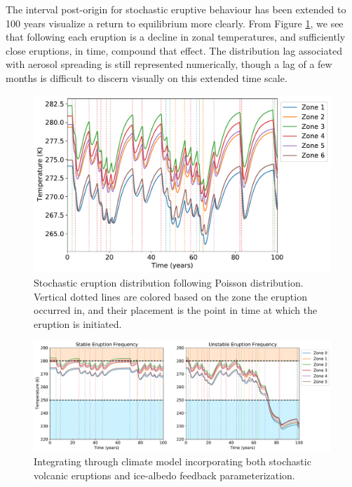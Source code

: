 \documentclass[12pt]{article}
\begin{document}
The interval post-origin for stochastic eruptive behaviour has been extended to
100 years visualize a return to equilibrium more clearly. From Figure
\ref{fig:stocherupt}, we see that following each eruption is a decline in zonal
temperatures, and sufficiently close eruptions, in time, compound that effect.
The distribution lag associated with aerosol spreading is still represented
numerically, though a lag of a few months is difficult to discern visually on
this extended time scale. 

\begin{figure}[H]
    \centering
    \includegraphics[scale=0.6]{stochastic_eruptions.pdf}
    \caption{
        Stochastic eruption distribution following Poisson distribution.
        Vertical dotted lines are colored based on the zone the eruption
        occurred in, and their placement is the point in time at which the
        eruption is initiated.
    }
    \label{fig:stocherupt}
\end{figure}
\FloatBarrier

\begin{figure}[H]
    \centering
    \includegraphics[width=\linewidth]{eruptions_albedo.pdf}
    \caption{
        Integrating through climate model incorporating both stochastic volcanic
        eruptions and ice-albedo feedback parameterization.
    }
    \label{fig:fireandice}
\end{figure}
\FloatBarrier
\end{document}
